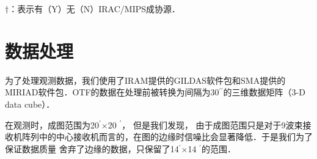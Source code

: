 \documentclass[UTF8, nocolorlinks]{pkuthss}
\newcommand{\multi}{$\times$}
\newcommand{\arcsec}{$^{\prime\prime}$}
\newcommand{\arcmin}{$^{\prime}$}
\begin{document}
        \label{Tab.SourceList}
			\begin{footnotesize}
			\begin{center}
			\setlength{\tabcolsep}{0.04in}
			\tablelasttail{\hline\bottomrule}
			\begin{supertabular}{lllcccclr}
			
			\end{supertabular}		
			\end{center}
			$\dagger$：表示有（Y）无（N）IRAC/MIPS成协源．
			\end{footnotesize}

	\section{数据处理}
        为了处理观测数据，我们使用了IRAM提供的GILDAS软件包\supercite{2000ASPC..217..299G}和SMA提供的MIRIAD软件包\supercite{1995ASPC...77..433S}．OTF的数据在处理前被转换为间隔为30\arcsec 的三维数据矩阵（3-D data cube）．

        在观测时，成图范围为20\arcmin \multi 20 \arcmin ， 但是我们发现， 由于成图范围只是对于9波束接收机阵列中的中心接收机而言的，在图的边缘时信噪比会显著降低．于是我们为了保证数据质量 舍弃了边缘的数据，只保留了14\arcmin \multi 14 \arcmin 的范围．
\end{document}
